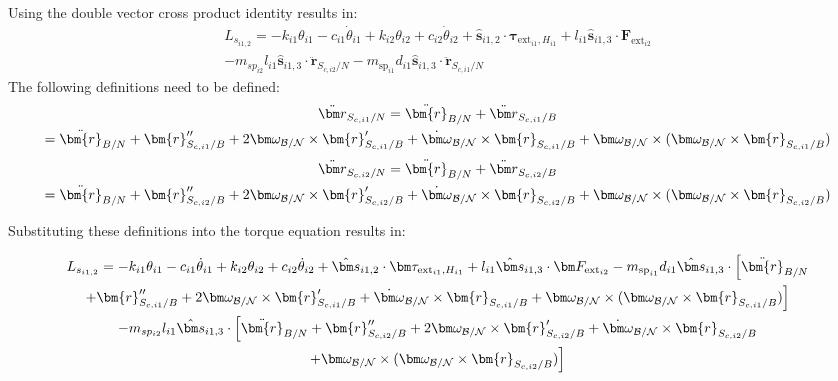 Using the double vector cross product identity results in:
\begin{multline}
	L_{s_{i1,2}} = - k_{i1} \theta_{i1} - c_{i1}\dot{\theta}_{i1} +  k_{i2} \theta_{i2} + c_{i2} \dot\theta_{i2} + \hat{\bm s}_{i1,2} \cdot \bm \tau_{\text{ext}_{i1},H_{i1}} + l_{i1} \hat{\bm s}_{i1,3} \cdot \bm F_{\text{ext}_{i2}} \\
	- m_{sp_{i2}} l_{i1} \hat{\bm s}_{i1,3} \cdot \ddot{\bm{r}}_{S_{c,i2}/N}
	- m_{\text{sp}_{i1}} d_{i1} \hat{\bm s}_{i1,3} \cdot  \ddot{\bm r}_{S_{c,i1}/N}
\end{multline}
The following definitions need to be defined:
\begin{multline}
	\ddot{\bm r}_{S_{c,i1}/N} = \ddot{\bm{r}}_{B/N} + \ddot{\bm r}_{S_{c,i1}/B} \\
	= \ddot{\bm{r}}_{B/N} + \bm{r}''_{S_{c,i1}/B} + 2 \bm\omega_{\cal B/N} \times \bm{r}'_{S_{c,i1}/B} +  \dot{\bm\omega}_{\cal B/N} \times \bm{r}_{S_{c,i1}/B} + \bm\omega_{\cal B/N} \times (\bm\omega_{\cal B/N} \times \bm{r}_{S_{c,i1}/B})
\end{multline}
\begin{multline}
	\ddot{\bm r}_{S_{c,i2}/N} = \ddot{\bm{r}}_{B/N} + \ddot{\bm r}_{S_{c,i2}/B} \\
	= \ddot{\bm{r}}_{B/N} + \bm{r}''_{S_{c,i2}/B} + 2 \bm\omega_{\cal B/N} \times \bm{r}'_{S_{c,i2}/B} +  \dot{\bm\omega}_{\cal B/N} \times \bm{r}_{S_{c,i2}/B} + \bm\omega_{\cal B/N} \times (\bm\omega_{\cal B/N} \times \bm{r}_{S_{c,i2}/B})
\end{multline}

Substituting these definitions into the torque equation results in:


\begin{multline}
	L_{s_{i1,2}} = - k_{i1} \theta_{i1} - c_{i1}\dot{\theta}_{i1} +  k_{i2} \theta_{i2} + c_{i2} \dot\theta_{i2} + \hat{\bm s}_{i1,2} \cdot \bm \tau_{\text{ext}_{i1},H_{i1}} + l_{i1} \hat{\bm s}_{i1,3} \cdot \bm F_{\text{ext}_{i2}}
	- m_{\text{sp}_{i1}} d_{i1} \hat{\bm s}_{i1,3} \cdot \Big[\ddot{\bm{r}}_{B/N} \\
	+ \bm{r}''_{S_{c,i1}/B} + 2 \bm\omega_{\cal B/N} \times \bm{r}'_{S_{c,i1}/B} +  \dot{\bm\omega}_{\cal B/N} \times \bm{r}_{S_{c,i1}/B}
	+ \bm\omega_{\cal B/N} \times (\bm\omega_{\cal B/N} \times \bm{r}_{S_{c,i1}/B})\Big]\\
	- m_{sp_{i2}} l_{i1} \hat{\bm s}_{i1,3} \cdot \Big[\ddot{\bm{r}}_{B/N} + \bm{r}''_{S_{c,i2}/B} + 2 \bm\omega_{\cal B/N} \times \bm{r}'_{S_{c,i2}/B} +  \dot{\bm\omega}_{\cal B/N} \times \bm{r}_{S_{c,i2}/B} \\
	+ \bm\omega_{\cal B/N} \times (\bm\omega_{\cal B/N} \times \bm{r}_{S_{c,i2}/B})\Big]
\end{multline}

